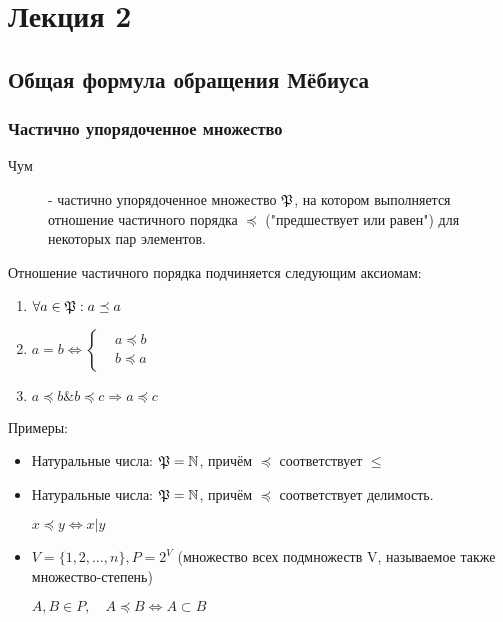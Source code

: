 
\chapter{Лекция 2}
\section{Общая формула обращения Мёбиуса}

\subsection{Частично упорядоченное множество} 

\begin{description}
\item[Чум] - частично упорядоченное множество $ \mathfrak{P} $, на котором выполняется отношение частичного порядка  $ \preceq $ ("предшествует или равен") для некоторых пар элементов. 
\end{description}

Отношение частичного порядка подчиняется следующим аксиомам:

\begin{enumerate}
\item 
$\forall a \in \mathfrak{P}: a
\preceq
a
$
\item
$ a = b \Longleftrightarrow 
\begin{cases}
&a \preceq b \\
&b \preceq a
\end{cases}
$

\item
$
a \preceq b \& b \preceq c \Rightarrow a \preceq c
$

\end{enumerate}


Примеры:

\begin{itemize}
\item Натуральные числа:  $\mathfrak{P} = \mathbb{N}$, причём 
$\preceq$ соответствует $\leq$
 
\item Натуральные числа:  $\mathfrak{P} = \mathbb{N}$, причём 
$\preceq$ соответствует делимость.

$x \preceq y \Leftrightarrow x | y $

\item
$
V = \{ 1, 2, \dots , n\}, P = 2^V
$ (множество всех подмножеств V, называемое также множество-степень) 

$A, B \in P, \quad A \preceq
B \Longleftrightarrow A \subset
 B
$
\end{itemize}

